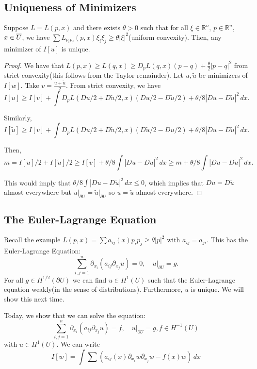 \documentclass[12pt]{scrartcl}
\newcommand{\R}{\mathbb{R}}
\newcommand{\<}{\langle}
\renewcommand{\>}{\rangle}
\let \p \partial
\begin{document}
\subsection{Uniqueness of Minimizers} 
\begin{thm} Suppose $L = L(p, x)$ and there exists $\theta > 0$ such that for all $\xi \in \R^n$, $p \in \R^n$, $x \in \overline U$, we have $\sum L_{p_i p_j}(p, x) \xi_i \xi_j \ge \theta|\xi|^2$(uniform convexity).  Then, any minimizer of $I[u]$ is unique.   
\end{thm}
\begin{proof}
We have that $L(p, x) \ge L(q, x) \ge D_pL(q, x)(p-q) + \frac{\theta}{2}|p-q|^2$ from strict convexity(this follows from the Taylor remainder).  Let $u, \tilde{u}$ be minimizers of $I[w]$.  Take $v = \frac{u + \tilde{u}}{2}$. From strict convexity, we have
$$I[u] \ge I[v] + \int D_pL(Du/2 + D\tilde{u} / 2, x) (Du/2 - D\tilde{u}/2) + \theta/8|Du - D\tilde{u}|^2\,dx.$$


Similarly, 
$$I[\tilde u] \ge I[v] + \int D_pL(Du/2 + D\tilde{u} / 2, x) (D\tilde{u}/2 - Du/2) + \theta/8|Du - D\tilde{u}|^2\,dx.$$

Then, $$m = I[u]/2 + I[\tilde{u}]/2 \ge I[v] + \theta/8\int  |Du - D\tilde{u}|^2\,dx \ge m + \theta/8 \int |Du - D\tilde{u}|^2\,dx.$$

This would imply that $\theta/8 \int |Du - D\tilde{u}|^2\,dx \le 0$, which implies that $Du = D\tilde{u}$ almost everywhere but $u \vert_{\partial U} = \tilde{u} \vert_{\partial U}$ so $u = \tilde{u}$ almost everywhere.  
\end{proof}

\subsection{The Euler-Lagrange Equation}
Recall the example $L(p, x) = \sum a_{ij}(x) p_i p_j \ge \theta|p|^2$ with $a_{ij} = a_{ji}$.  This has the Euler-Lagrange Equation:
$$\sum_{i, j = 1}^n\p_{x_i} (a_{ij} \p_{x_j} u) = 0, \quad u\vert_{\partial U} = g.$$
For all $g \in H^{1/2}(\partial U)$ we can find $u \in H^1(U)$ such that the Euler-Lagrange equation weakly(in the sense of distributions).  Furthermore, $u$ is unique.  We will show this next time.

Today, we show that we can solve the equation:
$$\sum_{i, j = 1}^n\p_{x_i} (a_{ij} \p_{x_j} u) = f, \quad u\vert_{\partial U} = g, f \in H^{-1}(U)$$
with $u \in H^1(U)$.  We can write 
$$I[w] = \int \sum \left (a_{ij}(x) \p_{x_i} w\p_{x_j} w - f(x) w \right ) \,dx$$
\end{document}
